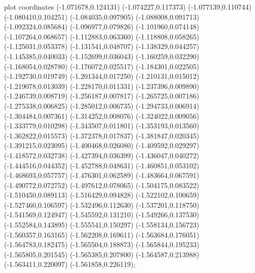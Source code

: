 { plot coordinates {(-1.071678,0.124131) (-1.074227,0.117373) (-1.077139,0.110744) (-1.080410,0.104251) (-1.084035,0.097905) (-1.088008,0.091713) (-1.092324,0.085684) (-1.096977,0.079826) (-1.101960,0.074148) (-1.107264,0.068657) (-1.112883,0.063360) (-1.118808,0.058265) (-1.125031,0.053378) (-1.131541,0.048707) (-1.138329,0.044257) (-1.145385,0.040033) (-1.152699,0.036043) (-1.160259,0.032290) (-1.168054,0.028780) (-1.176072,0.025517) (-1.184301,0.022505) (-1.192730,0.019749) (-1.201344,0.017250) (-1.210131,0.015012) (-1.219078,0.013039) (-1.228170,0.011331) (-1.237396,0.009890) (-1.246739,0.008719) (-1.256187,0.007817) (-1.265725,0.007186) (-1.275338,0.006825) (-1.285012,0.006735) (-1.294733,0.006914) (-1.304484,0.007361) (-1.314252,0.008076) (-1.324022,0.009056) (-1.333779,0.010298) (-1.343507,0.011801) (-1.353193,0.013560) (-1.362822,0.015573) (-1.372378,0.017837) (-1.381847,0.020345) (-1.391215,0.023095) (-1.400468,0.026080) (-1.409592,0.029297) (-1.418572,0.032738) (-1.427394,0.036399) (-1.436047,0.040272) (-1.444516,0.044352) (-1.452788,0.048631) (-1.460851,0.053102) (-1.468693,0.057757) (-1.476301,0.062589) (-1.483664,0.067591) (-1.490772,0.072752) (-1.497612,0.078065) (-1.504175,0.083522) (-1.510450,0.089113) (-1.516429,0.094828) (-1.522102,0.100659) (-1.527460,0.106597) (-1.532496,0.112630) (-1.537201,0.118750) (-1.541569,0.124947) (-1.545592,0.131210) (-1.549266,0.137530) (-1.552584,0.143895) (-1.555541,0.150297) (-1.558134,0.156723) (-1.560357,0.163165) (-1.562208,0.169611) (-1.563684,0.176051) (-1.564783,0.182475) (-1.565504,0.188873) (-1.565844,0.195233) (-1.565805,0.201545) (-1.565385,0.207800) (-1.564587,0.213988) (-1.563411,0.220097) (-1.561858,0.226119)};
}
